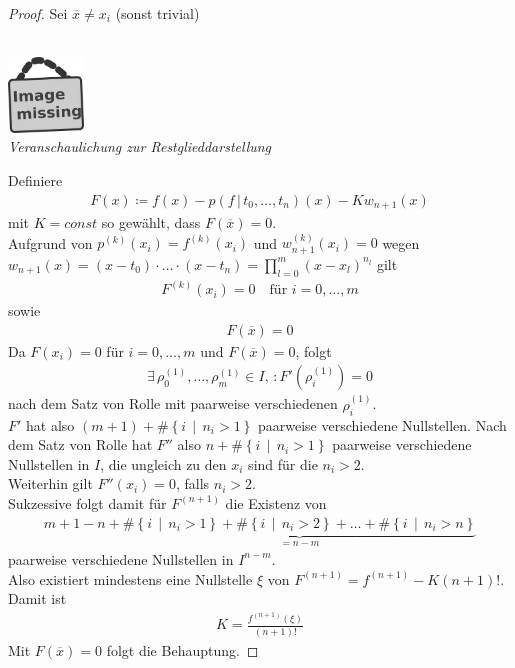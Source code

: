 \documentclass[ngerman,fontsize=11pt, paper=a4, parskip=half, titlepage=true, toc=bib]{scrbook}
\theoremstyle{definition}
\theoremstyle{plain}
\newcommand{\imagemissing}[1]{
  \begin{center}~\\
    \centering 
    \includegraphics[width=2cm]{images/image_missing.jpg}\\
    \textit{#1} \\
  \end{center}
}
\begin{document}
\begin{proof}
  Sei $\overline{x}\neq x_i$ (sonst trivial)
\imagemissing{Veranschaulichung zur Restglieddarstellung}


Definiere
\begin{gather}
  F(x) \coloneqq f(x)-p(f\,|\, t_0,\dots , t_n)(x) - Kw_{n+1}(x)
  \label{IV.1.22}
\end{gather}
mit $K=const$ so gewählt, dass $F(\overline{x})=0$.\\
Aufgrund von $p^{(k)}(x_i)=f^{(k)}(x_i)$
und $w_{n+1}^{(k)}(x_i) = 0$ wegen
$w_{n+1}(x) =
(x-t_0)\cdot\dots\cdot(x-t_n)=\prod_{l=0}^{m}(x-x_l)^{n_l}$
gilt
\begin{gather*}
  F^{(k)}(x_i) = 0 
  \quad \text{für } i=0,\dots,m 
\end{gather*}
sowie
\begin{gather*}
  F(\overline{x})=0
\end{gather*}
Da $F(x_i)=0$ für $i=0,\dots,m$ und $F(\overline{x})=0$, folgt
\begin{gather*}
  \exists\, \rho_0^{(1)},\dots,\rho_m^{(1)}\in I,\,
  : F'(\rho_i^{(1)})=0
\end{gather*}
nach dem Satz von Rolle 
mit paarweise verschiedenen $\rho_i^{(1)}$. \\
$F'$ hat also $(m+1)+\#\left\{i\,\middle\vert\, n_i>1\right\}$
paarweise verschiedene Nullstellen.
Nach dem Satz von Rolle hat $F''$ also 
$n+\#\left\{i\,\middle\vert\, n_i>1\right\}$
paarweise verschiedene Nullstellen in $I$,
die ungleich zu den $x_i$ sind für die $n_i>2$.\\
Weiterhin gilt $F''(x_i)=0$, falls $n_i>2$.\\
Sukzessive folgt damit für $F^{(n+1)}$ die Existenz von
\begin{gather*}
  m+1-n + \underbrace{
	  	\#\left\{i\,\middle\vert\, n_i>1\right\}
        + \#\left\{i\,\middle\vert\, n_i>2\right\}
        + \dots 
        + \#\left\{i\,\middle\vert\, n_i>n\right\}
        }_{=n-m}
\end{gather*}
paarweise verschiedene Nullstellen in $I^{n-m}$.\\
Also existiert mindestens eine Nullstelle $\xi$ von
$F^{(n+1)}=f^{(n+1)}-K(n+1)!$. Damit ist
\begin{gather*}
K=\frac{f^{(n+1)}(\xi)}{(n+1)!}
\end{gather*}
Mit $F(\overline{x}) =0$ folgt die Behauptung.
\end{proof}
\end{document}
